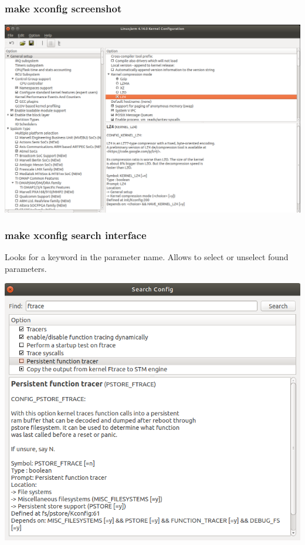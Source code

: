 \begin{frame}
  \frametitle{make xconfig screenshot}
  \begin{center}
    \includegraphics[width=\textwidth]{slides/sysdev-kernel-building/xconfig-screenshot.png}
  \end{center}
\end{frame}

\begin{frame}
  \frametitle{make xconfig search interface}

  Looks for a keyword in the parameter name. Allows to select or
  unselect found parameters.

  \begin{center}
    \includegraphics[height=0.7\textheight]{slides/sysdev-kernel-building/xconfig-search.png}
  \end{center}
\end{frame}

